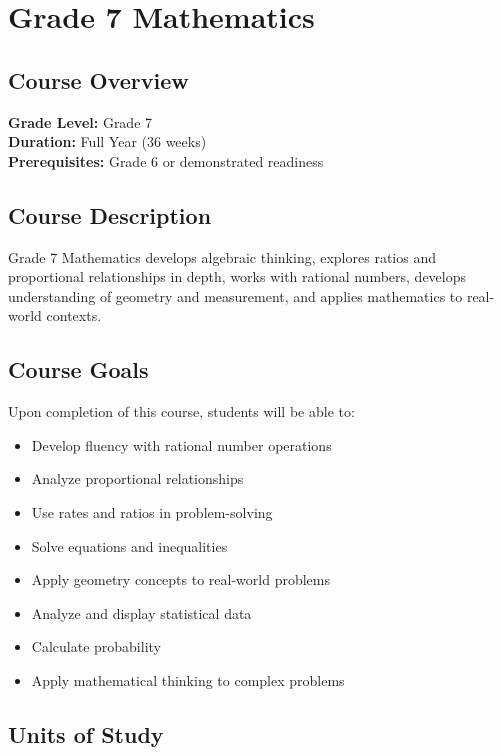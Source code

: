 \documentclass[11pt,letterpaper]{report}
\begin{document}
\chapter{Grade 7 Mathematics}

\section{Course Overview}

\textbf{Grade Level:} Grade 7\\
\textbf{Duration:} Full Year (36 weeks)\\
\textbf{Prerequisites:} Grade 6 or demonstrated readiness

\section{Course Description}

Grade 7 Mathematics develops algebraic thinking, explores ratios and proportional relationships in depth, works with rational numbers, develops understanding of geometry and measurement, and applies mathematics to real-world contexts.

\section{Course Goals}

Upon completion of this course, students will be able to:

\begin{itemize}
    \item Develop fluency with rational number operations
    \item Analyze proportional relationships
    \item Use rates and ratios in problem-solving
    \item Solve equations and inequalities
    \item Apply geometry concepts to real-world problems
    \item Analyze and display statistical data
    \item Calculate probability
    \item Apply mathematical thinking to complex problems
\end{itemize}

\section{Units of Study}
\end{document}
